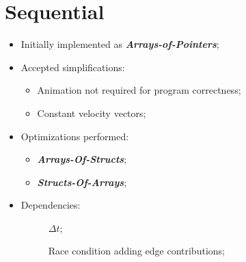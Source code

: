 \section{Sequential}

\begin{frame}
	\begin{itemize}
		\item Initially implemented as \textbf{\itshape Arrays-of-Pointers};
		\item Accepted simplifications:
		\begin{itemize}
			\item Animation not required for program correctness;
			\item Constant velocity vectors;
		\end{itemize}
		\item Optimizations performed:
		\begin{itemize}
			\item \textbf{\itshape Arrays-Of-Structs};
			\item \textbf{\itshape Structs-Of-Arrays};
		\end{itemize}
		\item Dependencies:
		\begin{description}
			\item[\computeflux\hfill] $\Delta t$;
			\item[\update\hfill] Race condition adding edge contributions;
		\end{description}
	\end{itemize}
\end{frame}